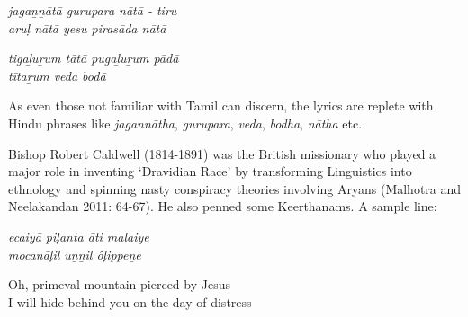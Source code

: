 \vspace{-.1cm}

\begin{longquote}
\textit{jagaṉṉātā gurupara nātā - tiru \\\hspace{2cm} aruḷ nātā yesu pirasāda nātā }
\end{longquote}

\begin{longquote}
\textit{tigaḻuṟum tātā pugaḻuṟum pādā\\\hspace{2cm} tītaṟum veda bodā}
\end{longquote}

\begin{longquote}
\end{longquote}

As even those not familiar with Tamil can discern, the lyrics are replete with Hindu phrases like \textit{jagannātha}, \textit{gurupara}, \textit{veda}, \textit{bodha}, \textit{nātha} etc.

Bishop Robert Caldwell (1814-1891) was the British missionary who played a major role in inventing `Dravidian Race' by transforming Linguistics into ethnology and spinning nasty conspiracy theories involving Aryans (Malhotra and Neelakandan 2011: 64-67). He also penned some Keerthanams. A sample line:

\vspace{-.1cm}

\begin{longquote}
\textit{ecaiyā piḷanta āti malaiye\\\hspace{2cm} mocanāḷil uṉṉil ôḷippeṉe }
\end{longquote}

\begin{longquote}
\end{longquote}

\begin{longquote}
Oh, primeval mountain pierced by Jesus\\ I will hide behind you on the day of distress
\end{longquote}

